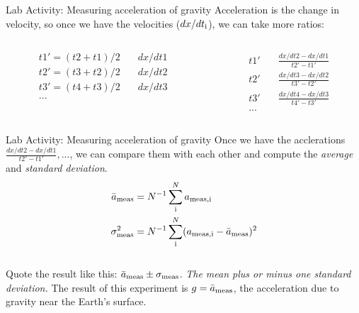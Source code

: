 \documentclass{beamer}
\begin{document}
\begin{frame}{Lab Activity: Measuring acceleration of gravity}
\small
Acceleration is the change in velocity, so once we have the velocities ($dx/dt_{\rm i}$), we can take more ratios:
\begin{columns}[T]
\begin{column}{0.5\textwidth}
\begin{align}
t1' = (t2+t1)/2 & \quad dx/dt1 \\
t2' = (t3+t2)/2 & \quad dx/dt2 \\
t3' = (t4+t3)/2  & \quad dx/dt3 \\
...
\end{align}
\end{column}
\begin{column}{0.5\textwidth}
\begin{align}
t1' & \quad \frac{dx/dt2-dx/dt1}{t2'-t1'} \\
t2' & \quad \frac{dx/dt3-dx/dt2}{t3'-t2'}  \\
t3' & \quad \frac{dx/dt4-dx/dt3}{t4'-t3'}  \\
...
\end{align}
\end{column}
\end{columns}
\end{frame}

\begin{frame}{Lab Activity: Measuring acceleration of gravity}
Once we have the acclerations $\frac{dx/dt2-dx/dt1}{t2'-t1'}, ...$, we can compare them with each other and compute the \textit{average} and \textit{standard deviation}.\\
\begin{align}
\bar{a}_{\rm meas} &= N^{-1} \sum_{\rm i}^N a_{\rm meas,i} \\
\sigma^2_{\rm meas} &= N^{-1} \sum_{\rm i}^N (a_{\rm meas,i}-\bar{a}_{\rm meas})^2
\end{align} \\
Quote the result like this: $\bar{a}_{\rm meas}\pm\sigma_{\rm meas}$.  \textit{The mean plus or minus one standard deviation.}  The result of this experiment is $g = \bar{a}_{\rm meas}$, the acceleration due to gravity near the Earth's surface.
\end{frame}
\end{document}
